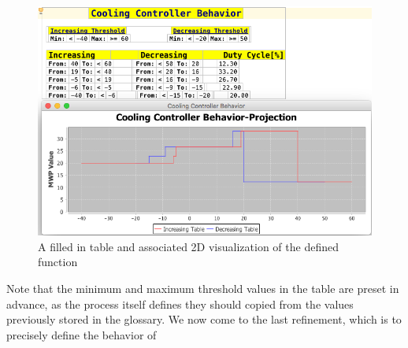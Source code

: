 % 
\begin{figure}[!h]
\centering
\includegraphics[width=.7\textwidth]{./figures/DiehlTableAnd2DGraph.png}
\vspace{-.3cm}
\caption{A filled in table and associated 2D visualization of the defined
function} 
\label{fig:FAU_behavior_2d}
 \vspace{-.7cm}
\end{figure}
Note that the minimum and maximum threshold values in the table are preset in
advance, as the process itself defines they should copied from the values
previously stored in the glossary.
We now come to the last refinement, which is to precisely define the behavior of
